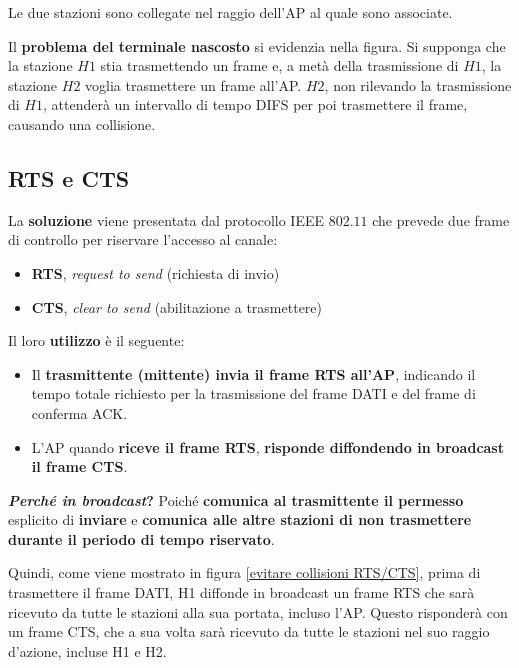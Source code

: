 \documentclass[a4paper]{article}
\begin{document}
	\noindent
	Le due stazioni sono collegate nel raggio dell’AP al quale sono associate.\newline
	
	\noindent
	Il \textcolor{Red3}{\textbf{problema del terminale nascosto}} si evidenzia nella figura. Si supponga che la stazione $H1$ stia trasmettendo un frame e, a  metà della trasmissione di $H1$, la stazione $H2$ voglia trasmettere un frame all'AP. $H2$, non rilevando la trasmissione di $H1$, attenderà un intervallo di tempo DIFS per poi trasmettere il frame, causando una collisione.\newpage
	
	\subsection{RTS e CTS}
	
	La \textcolor{Green4}{\textbf{soluzione}} viene presentata dal protocollo IEEE $802.11$ che prevede due frame di controllo per riservare l'accesso al canale:
	\begin{itemize}[label=-]
		\item \textbf{RTS}, \emph{request to send} (richiesta di invio)
		\item \textbf{CTS}, \emph{clear to send} (abilitazione a trasmettere)
	\end{itemize}
	Il loro \textbf{utilizzo} è il seguente:
	\begin{itemize}
		\item Il \textbf{trasmittente (mittente) invia il frame RTS all’AP}, indicando il tempo totale richiesto per la trasmissione del frame DATI e del frame di conferma ACK.
		\item L’AP quando \textbf{riceve il frame RTS}, \textbf{risponde diffondendo in broadcast il frame CTS}.
	\end{itemize}
	\textbf{\emph{Perché in broadcast}?} Poiché \textbf{comunica al trasmittente il permesso} esplicito di \textbf{inviare} e \textbf{comunica alle altre stazioni di non trasmettere durante il periodo di tempo riservato}.\newline
	
	\noindent
	Quindi, come viene mostrato in figura \ref{evitare collisioni RTS/CTS}, prima di trasmettere il frame DATI, H1 diffonde in broadcast un frame RTS che sarà ricevuto da tutte le stazioni alla sua portata, incluso l’AP. Questo risponderà con un frame CTS, che a sua volta sarà ricevuto da tutte le stazioni nel suo raggio d’azione, incluse H1 e H2.\newline
\end{document}
